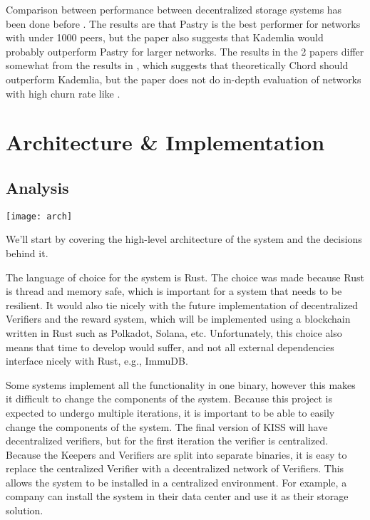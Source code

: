 \documentclass[ twoside,openright,titlepage,numbers=noenddot,headinclude,%
                footinclude=true,cleardoublepage=empty,abstractoff, %
                BCOR=5mm,paper=a4,fontsize=11pt,%
                ngerman,american,%
                ]{scrreprt}
\begin{document}
Comparison between performance between decentralized storage systems has been done before
\cite{kadvschordvspastry, 2019AIPC.2129b0131A}.
The results are that Pastry is the best performer for networks with under 1000 peers, but the paper also suggests
that Kademlia would probably outperform Pastry for larger networks.
The results in the 2 papers differ somewhat from the results in \cite{compstudy}, which suggests that theoretically
Chord should outperform Kademlia, but the paper does not do in-depth evaluation of networks with high churn rate
like \cite{kadvschordvspastry}.

\chapter{Architecture \& Implementation}
\label{cha:arch-impl}

\section{Analysis}
\label{sec:analysis}

\texttt{[image: arch]}

We'll start by covering the high-level architecture of the system and the decisions behind it.

The language of choice for the system is Rust.
The choice was made because Rust is thread and memory safe, which is important for a system that needs to be resilient.
It would also tie nicely with the future implementation of decentralized Verifiers and the reward system,
which will be implemented using a blockchain written in Rust such as Polkadot, Solana, etc.
Unfortunately, this choice also means that time to develop would suffer,
and not all external dependencies interface nicely with Rust, e.g., ImmuDB.

Some systems implement all the functionality in one binary,
however this makes it difficult to change the components of the system.
Because this project is expected to undergo multiple iterations,
it is important to be able to easily change the components of the system.
The final version of KISS will have decentralized verifiers,
but for the first iteration the verifier is centralized.
Because the Keepers and Verifiers are split into separate binaries,
it is easy to replace the centralized Verifier with a decentralized network of Verifiers.
This allows the system to be installed in a centralized environment.
For example, a company can install the system in their data center and use it as their storage solution.
\end{document}
